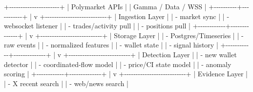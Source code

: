 \documentclass[
]{article}
\newenvironment{Shaded}{}{}
\newcommand{\NormalTok}[1]{#1}
\begin{document}
\begin{Shaded}
\begin{Highlighting}[]
\NormalTok{                +{-}{-}{-}{-}{-}{-}{-}{-}{-}{-}{-}{-}{-}{-}{-}{-}{-}{-}{-}{-}{-}{-}+}
\NormalTok{                |  Polymarket APIs     |}
\NormalTok{                |  Gamma / Data / WSS  |}
\NormalTok{                +{-}{-}{-}{-}{-}{-}{-}{-}{-}{-}+{-}{-}{-}{-}{-}{-}{-}{-}{-}{-}{-}+}
\NormalTok{                           |}
\NormalTok{                           v}
\NormalTok{              +{-}{-}{-}{-}{-}{-}{-}{-}{-}{-}{-}{-}{-}{-}{-}{-}{-}{-}{-}{-}{-}{-}{-}{-}{-}{-}{-}+}
\NormalTok{              |  Ingestion Layer          |}
\NormalTok{              |  {-} market sync            |}
\NormalTok{              |  {-} websocket listener     |}
\NormalTok{              |  {-} trades/activity pull   |}
\NormalTok{              |  {-} positions pull         |}
\NormalTok{              +{-}{-}{-}{-}{-}{-}{-}{-}{-}{-}{-}{-}+{-}{-}{-}{-}{-}{-}{-}{-}{-}{-}{-}{-}{-}{-}+}
\NormalTok{                           |}
\NormalTok{                           v}
\NormalTok{              +{-}{-}{-}{-}{-}{-}{-}{-}{-}{-}{-}{-}{-}{-}{-}{-}{-}{-}{-}{-}{-}{-}{-}{-}{-}{-}{-}+}
\NormalTok{              |  Storage Layer            |}
\NormalTok{              |  {-} Postgres/Timeseries    |}
\NormalTok{              |  {-} raw events             |}
\NormalTok{              |  {-} normalized features    |}
\NormalTok{              |  {-} wallet state           |}
\NormalTok{              |  {-} signal history         |}
\NormalTok{              +{-}{-}{-}{-}{-}{-}{-}{-}{-}{-}{-}{-}+{-}{-}{-}{-}{-}{-}{-}{-}{-}{-}{-}{-}{-}{-}+}
\NormalTok{                           |}
\NormalTok{                           v}
\NormalTok{              +{-}{-}{-}{-}{-}{-}{-}{-}{-}{-}{-}{-}{-}{-}{-}{-}{-}{-}{-}{-}{-}{-}{-}{-}{-}{-}{-}+}
\NormalTok{              |  Detection Layer          |}
\NormalTok{              |  {-} new wallet detector    |}
\NormalTok{              |  {-} coordinated{-}flow model |}
\NormalTok{              |  {-} price/CI state model   |}
\NormalTok{              |  {-} anomaly scoring        |}
\NormalTok{              +{-}{-}{-}{-}{-}{-}{-}{-}{-}{-}{-}{-}+{-}{-}{-}{-}{-}{-}{-}{-}{-}{-}{-}{-}{-}{-}+}
\NormalTok{                           |}
\NormalTok{                           v}
\NormalTok{              +{-}{-}{-}{-}{-}{-}{-}{-}{-}{-}{-}{-}{-}{-}{-}{-}{-}{-}{-}{-}{-}{-}{-}{-}{-}{-}{-}+}
\NormalTok{              |  Evidence Layer           |}
\NormalTok{              |  {-} X recent search        |}
\NormalTok{              |  {-} web/news search        |}

\end{Highlighting}
\end{Shaded}
\end{document}
